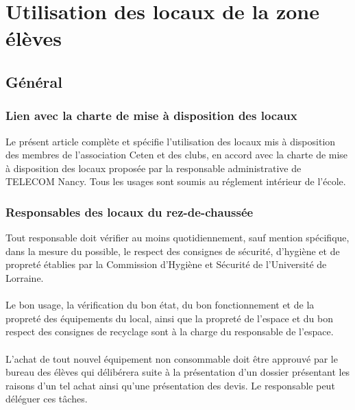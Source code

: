 \documentclass{article} %
\begin{document}
	\section{Utilisation des locaux de la zone élèves}
\label{sec:utilisation_des_locaux_de_la_zone_eleves}

		\subsection{Général}
\label{sub:general}

			\subsubsection{Lien avec la charte de mise à disposition des locaux}
\label{ssub:lien_avec_la_charte_de_mise_a_disposition_des_locaux}

				Le présent article complète et spécifie l’utilisation des locaux
				mis à disposition des membres de l’association Ceten et des
				clubs, en accord avec la charte de mise à disposition des locaux
				proposée par la responsable administrative de TELECOM
				Nancy. Tous les usages sont soumis au réglement intérieur de l'école.

			\subsubsection{Responsables des locaux du rez-de-chaussée}
\label{ssub:responsables_des_locaux_du_rez_de_chaussee}

				Tout responsable doit vérifier au moins quotidiennement, sauf
				mention spécifique, dans la mesure du possible, le respect des
				consignes de sécurité, d’hygiène et de propreté établies par la
				Commission d’Hygiène et Sécurité de l’Université de Lorraine.

                \paragraph{}
				Le bon usage, la vérification du bon état, du bon
				fonctionnement et de la propreté des équipements du local, ainsi
				que la propreté de l’espace et du bon respect des consignes de
				recyclage sont à la charge du responsable de l’espace.

                \paragraph{}
				L’achat de tout nouvel équipement non consommable doit être
				approuvé par le bureau des élèves qui délibérera suite à la
				présentation d’un dossier présentant les raisons d’un tel achat
				ainsi qu’une présentation des devis. Le responsable peut
				déléguer ces tâches.
\end{document}
